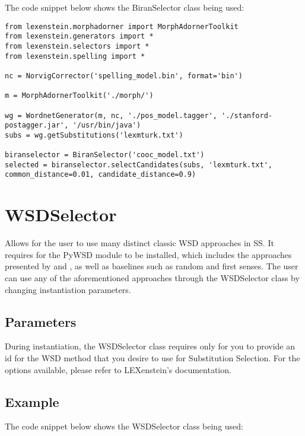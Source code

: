 The code snippet below shows the BiranSelector class being used:

\begin{lstlisting}
from lexenstein.morphadorner import MorphAdornerToolkit
from lexenstein.generators import *
from lexenstein.selectors import *
from lexenstein.spelling import *

nc = NorvigCorrector('spelling_model.bin', format='bin')

m = MorphAdornerToolkit('./morph/')

wg = WordnetGenerator(m, nc, './pos_model.tagger', './stanford-postagger.jar', '/usr/bin/java')
subs = wg.getSubstitutions('lexmturk.txt')

biranselector = BiranSelector('cooc_model.txt')
selected = biranselector.selectCandidates(subs, 'lexmturk.txt', common_distance=0.01, candidate_distance=0.9)
\end{lstlisting}














\section{WSDSelector}

Allows for the user to use many distinct classic WSD approaches in SS. It requires for the PyWSD \cite{pywsd} module to be installed, which includes the approaches presented by \cite{lesk} and \cite{wupalmer}, as well as baselines such as random and first senses. The user can use any of the aforementioned approaches through the WSDSelector class by changing instantiation parameters.

\subsection{Parameters}

During instantiation, the WSDSelector class requires only for you to provide an id for the WSD method that you desire to use for Substitution Selection. For the options available, please refer to LEXenstein's documentation.

\subsection{Example}

The code snippet below shows the WSDSelector class being used:

